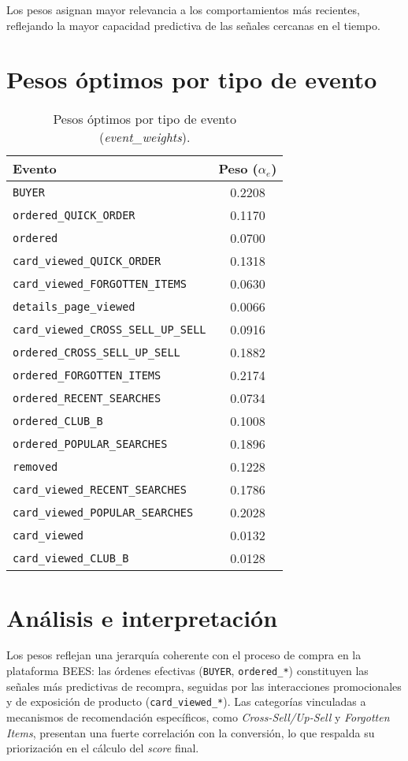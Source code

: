Los pesos asignan mayor relevancia a los comportamientos más recientes, reflejando la mayor capacidad predictiva de las señales cercanas en el tiempo.

\section{Pesos óptimos por tipo de evento}

\begin{table}[H]
\centering
\caption{Pesos óptimos por tipo de evento (\textit{event\_weights}).}
\begin{tabular}{lc}
\toprule
\textbf{Evento} & \textbf{Peso ($\alpha_e$)} \\
\midrule
\texttt{BUYER} & 0.2208 \\
\texttt{ordered\_QUICK\_ORDER} & 0.1170 \\
\texttt{ordered} & 0.0700 \\
\texttt{card\_viewed\_QUICK\_ORDER} & 0.1318 \\
\texttt{card\_viewed\_FORGOTTEN\_ITEMS} & 0.0630 \\
\texttt{details\_page\_viewed} & 0.0066 \\
\texttt{card\_viewed\_CROSS\_SELL\_UP\_SELL} & 0.0916 \\
\texttt{ordered\_CROSS\_SELL\_UP\_SELL} & 0.1882 \\
\texttt{ordered\_FORGOTTEN\_ITEMS} & 0.2174 \\
\texttt{ordered\_RECENT\_SEARCHES} & 0.0734 \\
\texttt{ordered\_CLUB\_B} & 0.1008 \\
\texttt{ordered\_POPULAR\_SEARCHES} & 0.1896 \\
\texttt{removed} & 0.1228 \\
\texttt{card\_viewed\_RECENT\_SEARCHES} & 0.1786 \\
\texttt{card\_viewed\_POPULAR\_SEARCHES} & 0.2028 \\
\texttt{card\_viewed} & 0.0132 \\
\texttt{card\_viewed\_CLUB\_B} & 0.0128 \\
\bottomrule
\end{tabular}
\label{tab:event_weights}
\end{table}

\section{Análisis e interpretación}

Los pesos reflejan una jerarquía coherente con el proceso de compra en la plataforma BEES: las órdenes efectivas (\texttt{BUYER}, \texttt{ordered\_*}) constituyen las señales más predictivas de recompra, seguidas por las interacciones promocionales y de exposición de producto (\texttt{card\_viewed\_*}).  
Las categorías vinculadas a mecanismos de recomendación específicos, como \textit{Cross-Sell/Up-Sell} y \textit{Forgotten Items}, presentan una fuerte correlación con la conversión, lo que respalda su priorización en el cálculo del \textit{score} final.  

